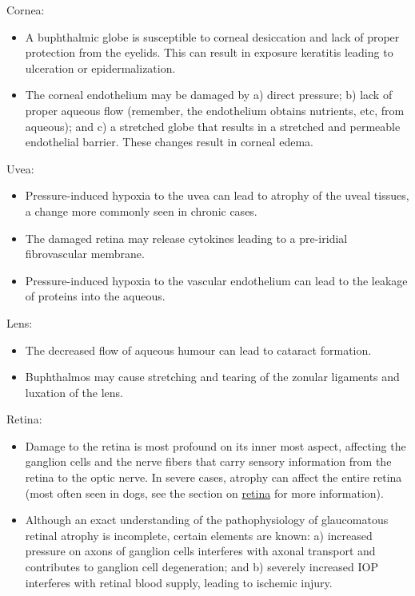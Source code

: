 \documentclass[openany]{article}
\providecommand{\tightlist}{%
  \setlength{\itemsep}{0pt}\setlength{\parskip}{0pt}}
\begin{document}
Cornea:

\begin{itemize}
\tightlist
\item
  A buphthalmic globe is susceptible to corneal desiccation and lack of
  proper protection from the eyelids. This can result in exposure
  keratitis leading to ulceration or epidermalization.
\item
  The corneal endothelium may be damaged by a) direct pressure; b) lack
  of proper aqueous flow (remember, the endothelium obtains nutrients,
  etc, from aqueous); and c) a stretched globe that results in a
  stretched and permeable endothelial barrier. These changes result in
  corneal edema.
\end{itemize}

Uvea:

\begin{itemize}
\tightlist
\item
  Pressure-induced hypoxia to the uvea can lead to atrophy of the uveal
  tissues, a change more commonly seen in chronic cases.
\item
  The damaged retina may release cytokines leading to a pre-iridial
  fibrovascular membrane.
\item
  Pressure-induced hypoxia to the vascular endothelium can lead to the
  leakage of proteins into the aqueous.
\end{itemize}

Lens:

\begin{itemize}
\tightlist
\item
  The decreased flow of aqueous humour can lead to cataract formation.
\item
  Buphthalmos may cause stretching and tearing of the zonular ligaments
  and luxation of the lens.
\end{itemize}

Retina:

\begin{itemize}
\tightlist
\item
  Damage to the retina is most profound on its inner most aspect,
  affecting the ganglion cells and the nerve fibers that carry sensory
  information from the retina to the optic nerve. In severe cases,
  atrophy can affect the entire retina (most often seen in dogs, see the
  section on \protect\hyperlink{pathology-of-the-retina}{retina} for
  more information).
\item
  Although an exact understanding of the pathophysiology of glaucomatous
  retinal atrophy is incomplete, certain elements are known: a)
  increased pressure on axons of ganglion cells interferes with axonal
  transport and contributes to ganglion cell degeneration; and b)
  severely increased IOP interferes with retinal blood supply, leading
  to ischemic injury.
\end{itemize}
\end{document}
